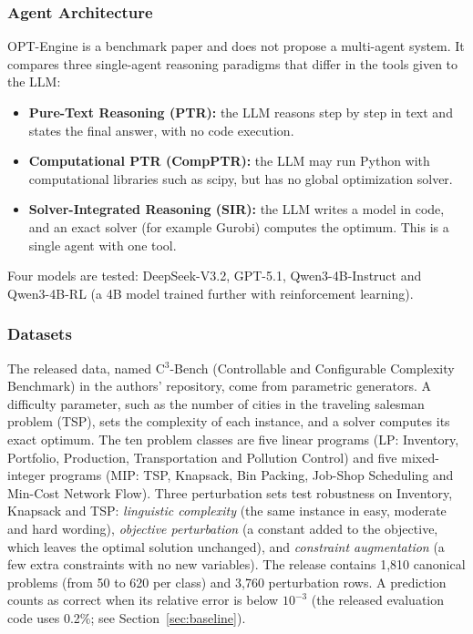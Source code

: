 \documentclass[11pt,a4paper]{article}
\newcommand{\cthree}{C$^3$-Bench}
\begin{document}
\subsubsection{Agent Architecture}

OPT-Engine is a benchmark paper and does not propose a multi-agent system. It compares three single-agent reasoning paradigms that differ in the tools given to the LLM:
\begin{itemize}[leftmargin=1.6em]
\item \textbf{Pure-Text Reasoning (PTR):} the LLM reasons step by step in text and states the final answer, with no code execution.
\item \textbf{Computational PTR (CompPTR):} the LLM may run Python with computational libraries such as scipy, but has no global optimization solver.
\item \textbf{Solver-Integrated Reasoning (SIR):} the LLM writes a model in code, and an exact solver (for example Gurobi) computes the optimum. This is a single agent with one tool.
\end{itemize}
Four models are tested: DeepSeek-V3.2, GPT-5.1, Qwen3-4B-Instruct and Qwen3-4B-RL (a 4B model trained further with reinforcement learning).

\subsubsection{Datasets}

The released data, named \cthree{} (Controllable and Configurable Complexity Benchmark) in the authors' repository, come from parametric generators. A difficulty parameter, such as the number of cities in the traveling salesman problem (TSP), sets the complexity of each instance, and a solver computes its exact optimum. The ten problem classes are five linear programs (LP: Inventory, Portfolio, Production, Transportation and Pollution Control) and five mixed-integer programs (MIP: TSP, Knapsack, Bin Packing, Job-Shop Scheduling and Min-Cost Network Flow). Three perturbation sets test robustness on Inventory, Knapsack and TSP: \textit{linguistic complexity} (the same instance in easy, moderate and hard wording), \textit{objective perturbation} (a constant added to the objective, which leaves the optimal solution unchanged), and \textit{constraint augmentation} (a few extra constraints with no new variables). The release contains 1,810 canonical problems (from 50 to 620 per class) and 3,760 perturbation rows. A prediction counts as correct when its relative error is below $10^{-3}$ (the released evaluation code uses 0.2\%; see Section~\ref{sec:baseline}).
\end{document}
